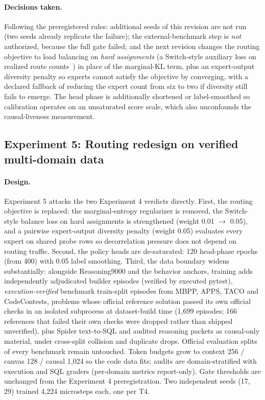 \documentclass[10pt,a4paper]{article}
\begin{document}
\paragraph{Decisions taken.}
Following the preregistered rules: additional seeds of this revision are not
run (two seeds already replicate the failure); the external-benchmark step is
\emph{not} authorized, because the full gate failed; and the next revision
changes the routing objective to load balancing on \emph{hard assignments}
(a Switch-style auxiliary loss on realized route counts~\cite{fedus2022}) in
place of the marginal-KL term, plus an expert-output diversity penalty so
experts cannot satisfy the objective by converging, with a declared fallback
of reducing the expert count from six to two if diversity still fails to
emerge. The head phase is additionally shortened or label-smoothed so
calibration operates on an unsaturated score scale, which also unconfounds
the causal-liveness measurement.

\subsection{Experiment 5: Routing redesign on verified multi-domain data}
\label{sec:study5}

\paragraph{Design.}
Experiment 5 attacks the two Experiment 4 verdicts directly. First, the routing
objective is replaced: the marginal-entropy regularizer is removed, the
Switch-style balance loss on hard assignments is strengthened (weight 0.01
$\rightarrow$ 0.05), and a pairwise expert-output diversity penalty (weight
0.05) evaluates every expert on shared probe rows so decorrelation pressure
does not depend on routing traffic. Second, the policy heads are de-saturated:
120 head-phase epochs (from 400) with 0.05 label smoothing. Third, the data
boundary widens substantially: alongside Reasoning9000 and the behavior
anchors, training adds independently adjudicated builder episodes (verified by
executed pytest), \emph{execution-verified} benchmark train-split episodes from
MBPP, APPS, TACO and CodeContests, problems whose official reference solution
passed its own official checks in an isolated subprocess at dataset-build time
(1,699 episodes; 166 references that failed their own checks were dropped
rather than shipped unverified), plus Spider text-to-SQL and audited
reasoning packets as causal-only material, under cross-split collision and
duplicate drops. Official evaluation splits of every benchmark remain
untouched. Token budgets grow to context 256 / canvas 128 / causal 1,024 so
the code data fits; audits are domain-stratified with execution and SQL
graders (per-domain metrics report-only). Gate thresholds are unchanged from
the Experiment 4 preregistration. Two independent seeds (17, 29) trained 4,224
microsteps each, one per T4.
\end{document}

